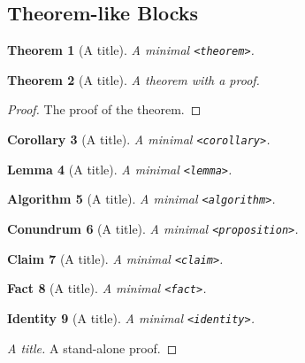 \documentclass[pdflatex]{sn-jnl}
\theoremstyle{thmstyleone}%
\newtheorem{theorem}{Theorem}[section]
\newtheorem{proposition}[theorem]{Conundrum}
\newtheorem{lemma}[theorem]{Lemma}
\newtheorem{corollary}[theorem]{Corollary}
\newtheorem{claim}[theorem]{Claim}
\newtheorem{fact}[theorem]{Fact}
\newtheorem{identity}[theorem]{Identity}
\theoremstyle{thmstyletwo}%
\newtheorem{algorithm}[theorem]{Algorithm}
\theoremstyle{thmstylethree}%
\newcommand{\mono}[1]{\texttt{#1}}
\numberwithin{equation}{section}
\begin{document}
\subsection{Theorem-like Blocks}\label{block-samples-theorem-like}%
\begin{theorem}[A title]\label{block-samples-theorem-like-2}%
%
A minimal \mono{<theorem>}.%
\end{theorem}
\begin{theorem}[A title]\label{block-samples-theorem-like-3}%
%
A theorem with a proof.%
\end{theorem}
\begin{proof}\label{block-samples-theorem-like-3-3}%
The proof of the theorem.%
\end{proof}
\begin{corollary}[A title]\label{block-samples-theorem-like-4}%
%
A minimal \mono{<corollary>}.%
\end{corollary}
\begin{lemma}[A title]\label{block-samples-theorem-like-5}%
%
A minimal \mono{<lemma>}.%
\end{lemma}
\begin{algorithm}[A title]\label{block-samples-theorem-like-6}%
%
A minimal \mono{<algorithm>}.%
\end{algorithm}
\begin{proposition}[A title]\label{block-samples-theorem-like-7}%
%
A minimal \mono{<proposition>}.%
\end{proposition}
\begin{claim}[A title]\label{block-samples-theorem-like-8}%
%
A minimal \mono{<claim>}.%
\end{claim}
\begin{fact}[A title]\label{block-samples-theorem-like-9}%
%
A minimal \mono{<fact>}.%
\end{fact}
\begin{identity}[A title]\label{block-samples-theorem-like-10}%
%
A minimal \mono{<identity>}.%
\end{identity}
\begin{proof}[A title]\label{block-samples-theorem-like-11}%
A stand-alone proof.%
\end{proof}
%
%
\typeout{************************************************}
\typeout{************************************************}
%
\end{document}

